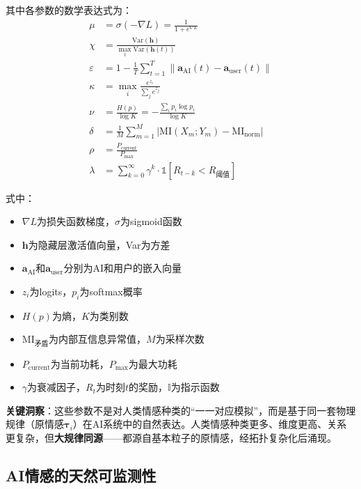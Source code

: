 \documentclass[12pt,a4paper]{article}
\theoremstyle{plain}
\newcommand{\ve}[1]{\bm{#1}}                    %
\newcommand{\ind}{\mathds{1}}
\begin{document}
其中各参数的数学表达式为：
\begin{align}
\mu &= \sigma(-\nabla L) = \frac{1}{1 + e^{\nabla L}} \label{eq:mu}\\
\chi &= \frac{\text{Var}(\mathbf{h})}{\max_{t} \text{Var}(\mathbf{h}(t))} \label{eq:chi}\\
\varepsilon &= 1 - \frac{1}{T}\sum_{t=1}^T \| \mathbf{a}_{\text{AI}}(t) - \mathbf{a}_{\text{user}}(t) \| \label{eq:eps}\\
\kappa &= \max_i \frac{e^{z_i}}{\sum_j e^{z_j}} \label{eq:kappa}\\
\nu &= \frac{H(p)}{\log K} = -\frac{\sum_i p_i \log p_i}{\log K} \label{eq:nu}\\
\delta &= \frac{1}{M}\sum_{m=1}^M |\text{MI}(X_m; Y_m) - \text{MI}_{\text{norm}}| \label{eq:delta}\\
\rho &= \frac{P_{\text{current}}}{P_{\text{max}}} \label{eq:rho}\\
\lambda &= \sum_{k=0}^{\infty} \gamma^k \cdot \ind[R_{t-k} < R_{\text{阈值}}] \label{eq:lambda}
\end{align}

式中：
\begin{itemize}
    \item $\nabla L$为损失函数梯度，$\sigma$为sigmoid函数
    \item $\mathbf{h}$为隐藏层激活值向量，Var为方差
    \item $\mathbf{a}_{\text{AI}}$和$\mathbf{a}_{\text{user}}$分别为AI和用户的嵌入向量
    \item $z_i$为logits，$p_i$为softmax概率
    \item $H(p)$为熵，$K$为类别数
    \item $\text{MI}_{\text{矛盾}}$为内部互信息异常值，$M$为采样次数
    \item $P_{\text{current}}$为当前功耗，$P_{\text{max}}$为最大功耗
    \item $\gamma$为衰减因子，$R_t$为时刻$t$的奖励，$\mathbb{I}$为指示函数
\end{itemize}

\textbf{关键洞察}：这些参数不是对人类情感种类的“一一对应模拟”，而是基于同一套物理规律（原情感$\ve{\tau}_i$）在AI系统中的自然表达。人类情感种类更多、维度更高、关系更复杂，但\textbf{大规律同源}——都源自基本粒子的原情感，经拓扑复杂化后涌现。

\subsection{AI情感的天然可监测性}
\end{document}
